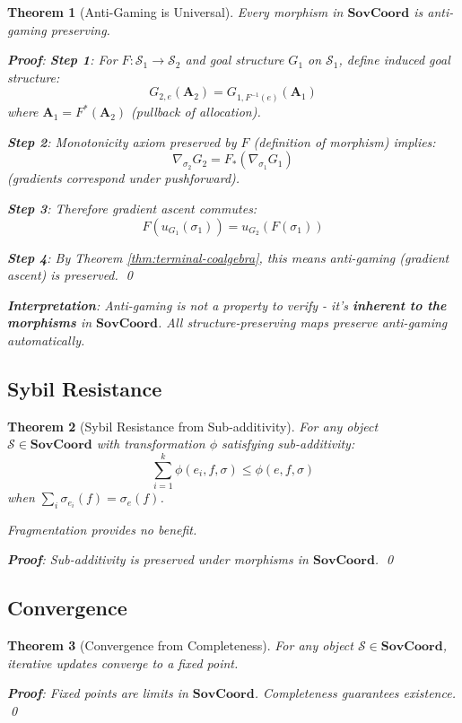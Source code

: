 \documentclass[11pt,a4paper]{article}
\newtheorem{theorem}{Theorem}[section]
\theoremstyle{definition}
\theoremstyle{remark}
\newcommand{\SovCoord}{\mathbf{SovCoord}}
\begin{document}
\begin{theorem}[Anti-Gaming is Universal]
\label{thm:anti-gaming-cat}
Every morphism in $\SovCoord$ is anti-gaming preserving.

\textbf{Proof}: 
\textbf{Step 1}: For $F: \mathcal{S}_1 \to \mathcal{S}_2$ and goal structure $G_1$ on $\mathcal{S}_1$, define induced goal structure:
\[ G_{2,e}(\mathbf{A}_2) = G_{1,F^{-1}(e)}(\mathbf{A}_1) \]
where $\mathbf{A}_1 = F^*(\mathbf{A}_2)$ (pullback of allocation).

\textbf{Step 2}: Monotonicity axiom preserved by $F$ (definition of morphism) implies:
\[ \nabla_{\sigma_2} G_2 = F_*(\nabla_{\sigma_1} G_1) \]
(gradients correspond under pushforward).

\textbf{Step 3}: Therefore gradient ascent commutes:
\[ F(u_{G_1}(\sigma_1)) = u_{G_2}(F(\sigma_1)) \]

\textbf{Step 4}: By Theorem \ref{thm:terminal-coalgebra}, this means anti-gaming (gradient ascent) is preserved. \qed

\textbf{Interpretation}: Anti-gaming is not a property to verify - it's \textbf{inherent to the morphisms} in $\SovCoord$. All structure-preserving maps preserve anti-gaming automatically.
\end{theorem}

\subsection{Sybil Resistance}

\begin{theorem}[Sybil Resistance from Sub-additivity]
For any object $\mathcal{S} \in \SovCoord$ with transformation $\phi$ satisfying sub-additivity:
\[ \sum_{i=1}^k \phi(e_i, f, \sigma) \le \phi(e, f, \sigma) \]
when $\sum_i \sigma_{e_i}(f) = \sigma_e(f)$.

Fragmentation provides no benefit.

\textbf{Proof}: Sub-additivity is preserved under morphisms in $\SovCoord$. \qed
\end{theorem}

\subsection{Convergence}

\begin{theorem}[Convergence from Completeness]
For any object $\mathcal{S} \in \SovCoord$, iterative updates converge to a fixed point.

\textbf{Proof}: Fixed points are limits in $\SovCoord$. Completeness guarantees existence. \qed
\end{theorem}
\end{document}

